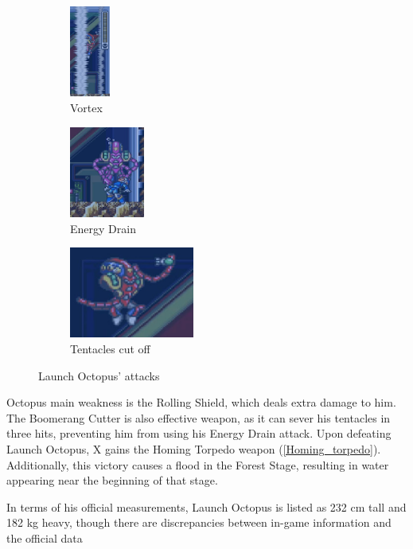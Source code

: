 \begin{figure}[htp]
	\begin{subfigure}[c]{0.15\textwidth}
		\centering
		\includegraphics[height=3cm]{figures/X1/Launch_octopus/Octopus_vortex.jpg}
		\caption{Vortex}
	\end{subfigure}
	\begin{subfigure}[c]{0.22\textwidth}
		\centering
		\includegraphics[height=3cm]{figures/X1/Launch_octopus/Octopus_drain.jpg}
		\caption{Energy Drain}
	\end{subfigure}
	\begin{subfigure}[c]{0.4\textwidth}
		\centering
		\includegraphics[height=3cm]{figures/X1/Launch_octopus/Octopus_cut.jpg}
		\caption{Tentacles cut off}
	\end{subfigure}
	\caption{Launch Octopus' attacks~\cite{wiki:Launch_octopus,book:Compendium}}
\end{figure}
Octopus main weakness is the Rolling Shield, which deals extra damage to him. The Boomerang Cutter is also effective weapon, as it can sever his tentacles in three hits, preventing him from using his Energy Drain attack. Upon defeating Launch Octopus, X gains the Homing Torpedo weapon (\ref{Homing_torpedo}). Additionally, this victory causes a flood in the Forest Stage, resulting in water appearing near the beginning of that stage.

In terms of his official measurements, Launch Octopus is listed as 232 cm tall and 182 kg heavy\cite{wayback:X_resources}, though there are discrepancies between in-game information and the official data~\cite{wiki:Launch_octopus}


